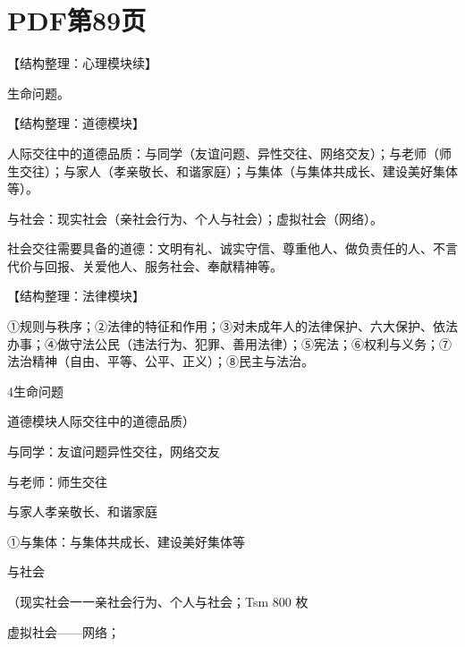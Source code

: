 \documentclass[lang=cn,11pt]{elegantbook}
\newcommand{\daofasym}[1]{{\daofasymbolfont #1}}
\newcommand{\daofasym}[1]{#1}
\begin{document}
\section*{PDF第89页}

【结构整理：心理模块续】\par

生命问题。\par

【结构整理：道德模块】\par

人际交往中的道德品质：与同学（友谊问题、异性交往、网络交友）；与老师（师生交往）；与家人（孝亲敬长、和谐家庭）；与集体（与集体共成长、建设美好集体等）。\par

与社会：现实社会（亲社会行为、个人与社会）；虚拟社会（网络）。\par

社会交往需要具备的道德：文明有礼、诚实守信、尊重他人、做负责任的人、不言代价与回报、关爱他人、服务社会、奉献精神等。\par

【结构整理：法律模块】\par

\daofasym{①}规则与秩序；\daofasym{②}法律的特征和作用；\daofasym{③}对未成年人的法律保护、六大保护、依法办事；\daofasym{④}做守法公民（违法行为、犯罪、善用法律）；\daofasym{⑤}宪法；\daofasym{⑥}权利与义务；\daofasym{⑦}法治精神（自由、平等、公平、正义）；\daofasym{⑧}民主与法治。\par

4生命问题\par

道德模块人际交往中的道德品质）\par

与同学：友谊问题异性交往，网络交友\par

与老师：师生交往\par

与家人孝亲敬长、和谐家庭\par

\daofasym{①}与集体：与集体共成长、建设美好集体等\par

与社会\par

（现实社会一一亲社会行为、个人与社会；Tsm 800 枚\par

虚拟社会——网络；\par
\end{document}
